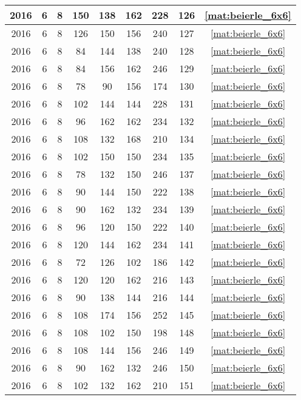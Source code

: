\begin{longtable}{|c|c|c|c|c|c|c|c|c|}
2016 & 6 & 8 & 150 & 138 & 162 & 228 & 126 & \eqref{mat:beierle_6x6} \\ \hline 
2016 & 6 & 8 & 126 & 150 & 156 & 240 & 127 & \eqref{mat:beierle_6x6} \\ \hline 
2016 & 6 & 8 & 84 & 144 & 138 & 240 & 128 & \eqref{mat:beierle_6x6} \\ \hline 
2016 & 6 & 8 & 84 & 156 & 162 & 246 & 129 & \eqref{mat:beierle_6x6} \\ \hline 
2016 & 6 & 8 & 78 & 90 & 156 & 174 & 130 & \eqref{mat:beierle_6x6} \\ \hline 
2016 & 6 & 8 & 102 & 144 & 144 & 228 & 131 & \eqref{mat:beierle_6x6} \\ \hline 
2016 & 6 & 8 & 96 & 162 & 162 & 234 & 132 & \eqref{mat:beierle_6x6} \\ \hline 
2016 & 6 & 8 & 108 & 132 & 168 & 210 & 134 & \eqref{mat:beierle_6x6} \\ \hline 
2016 & 6 & 8 & 102 & 150 & 150 & 234 & 135 & \eqref{mat:beierle_6x6} \\ \hline 
2016 & 6 & 8 & 78 & 132 & 150 & 246 & 137 & \eqref{mat:beierle_6x6} \\ \hline 
2016 & 6 & 8 & 90 & 144 & 150 & 222 & 138 & \eqref{mat:beierle_6x6} \\ \hline 
2016 & 6 & 8 & 90 & 162 & 132 & 234 & 139 & \eqref{mat:beierle_6x6} \\ \hline 
2016 & 6 & 8 & 96 & 120 & 150 & 222 & 140 & \eqref{mat:beierle_6x6} \\ \hline 
2016 & 6 & 8 & 120 & 144 & 162 & 234 & 141 & \eqref{mat:beierle_6x6} \\ \hline 
2016 & 6 & 8 & 72 & 126 & 102 & 186 & 142 & \eqref{mat:beierle_6x6} \\ \hline 
2016 & 6 & 8 & 120 & 120 & 162 & 216 & 143 & \eqref{mat:beierle_6x6} \\ \hline 
2016 & 6 & 8 & 90 & 138 & 144 & 216 & 144 & \eqref{mat:beierle_6x6} \\ \hline 
2016 & 6 & 8 & 108 & 174 & 156 & 252 & 145 & \eqref{mat:beierle_6x6} \\ \hline 
2016 & 6 & 8 & 108 & 102 & 150 & 198 & 148 & \eqref{mat:beierle_6x6} \\ \hline 
2016 & 6 & 8 & 108 & 144 & 156 & 246 & 149 & \eqref{mat:beierle_6x6} \\ \hline 
2016 & 6 & 8 & 90 & 162 & 132 & 246 & 150 & \eqref{mat:beierle_6x6} \\ \hline 
2016 & 6 & 8 & 102 & 132 & 162 & 210 & 151 & \eqref{mat:beierle_6x6} \\ \hline 

\end{longtable}
